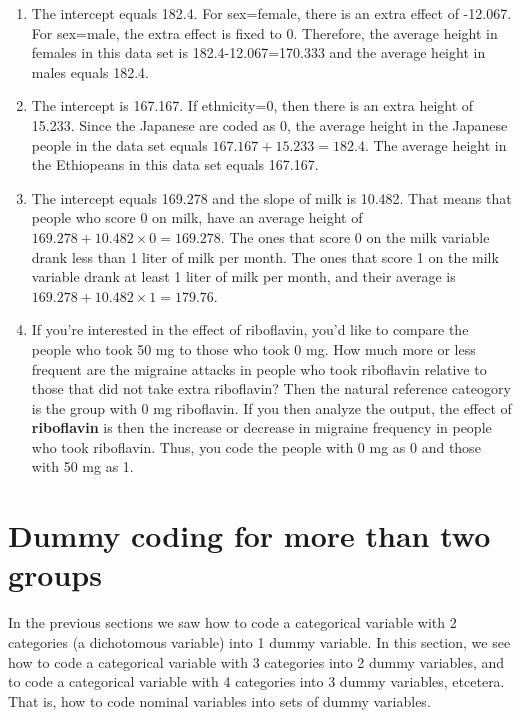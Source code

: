 \documentclass[]{book}\usepackage[]{graphicx}\usepackage[]{color}
\begin{document}
\begin{enumerate}
\item The intercept equals 182.4. For sex=female, there is an extra effect of -12.067. For sex=male, the extra effect is fixed to 0. Therefore, the average height in females in this data set is 182.4-12.067=170.333 and the average height in males equals 182.4. 

\item 
The intercept is 167.167. If ethnicity=0, then there is an extra height of 15.233. Since the 
Japanese are coded as 0, the average height in the Japanese people in the data set equals $167.167+15.233= 182.4$. The average height in the Ethiopeans in this data set equals 167.167. 

\item The intercept equals 169.278 and the slope of milk is 10.482. That means that people who score 0 on milk, have an average height of $169.278 + 10.482 \times 0 = 169.278$. The ones that score 0 on the milk variable drank less than 1 liter of milk per month. The ones that score 1 on the milk variable drank at least 1 liter of milk per month, and their average is $169.278 + 10.482 \times 1 = 179.76$.

\item If you're interested in the effect of riboflavin, you'd like to compare the people who took 50 mg to those who took 0 mg. How much more or less frequent are the migraine attacks in people who took riboflavin relative to those that did not take extra riboflavin? Then the natural reference cateogory is the group with 0 mg riboflavin. If you then analyze the output, the effect of \textbf{riboflavin} is then the increase or decrease in migraine frequency in people who took riboflavin. Thus, you code the people with 0 mg as 0 and those with 50 mg as 1.

\end{enumerate}



\section{Dummy coding for more than two groups}

In the previous sections we saw how to code a categorical variable with 2 categories (a dichotomous variable) into 1 dummy variable. In this section, we see how to code a categorical variable with 3 categories into 2 dummy variables, and to code a categorical variable with 4 categories into 3 dummy variables, etcetera. That is, how to code nominal variables into sets of dummy variables.
\end{document}

